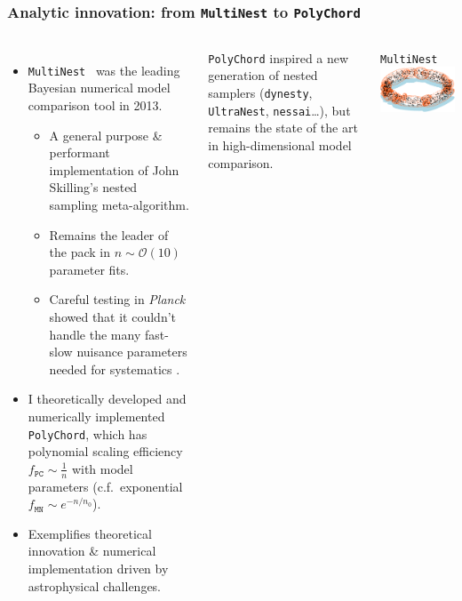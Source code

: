 \documentclass[aspectratio=169]{beamer}
\begin{document}
\begin{frame}
    \frametitle{Analytic innovation: from \texttt{MultiNest} to \texttt{PolyChord}}
    \begin{columns}
        \begin{itemize}
            \item \texttt{MultiNest}~ was the leading Bayesian numerical model comparison tool in 2013.
                \begin{itemize}
                    \item A general purpose \& performant implementation of John Skilling's nested sampling meta-algorithm.
                    \item Remains the leader of the pack in $n\sim\mathcal{O}(10)$ parameter fits.
                    \item Careful testing in \textit{Planck} showed that it couldn't handle the many fast-slow nuisance parameters needed for systematics .
                \end{itemize}
            \item I theoretically developed and numerically implemented \texttt{PolyChord}, which has polynomial scaling efficiency $f_{\texttt{PC}}\sim \frac{1}{n}$ with model parameters (c.f.\ exponential $f_{\texttt{MN}}\sim e^{-n/n_0}$).
            \item Exemplifies theoretical innovation \& numerical implementation driven by astrophysical challenges.
        \end{itemize}
        \texttt{PolyChord} inspired a new generation of nested samplers (\texttt{dynesty}, \texttt{UltraNest}, \texttt{nessai}\ldots), but remains the state of the art in high-dimensional model comparison.
        \vspace{-10pt}
        \begin{block}{\texttt{MultiNest}~}
            \includegraphics[width=\textwidth]{figures/multinest.pdf}

\end{block}
\end{columns}
\end{frame}
\end{document}
